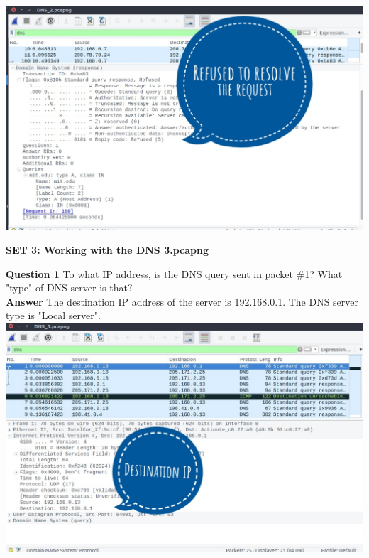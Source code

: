 \documentclass[14pt]{extarticle}
\begin{document}
    \includegraphics[scale=0.45]{2_4_2}\\[10pt] 
    \vspace{1cm}

    \begin{center}
        {\Large \textbf{SET 3: Working with the DNS 3.pcapng}}
    \end{center}

    \noindent
    \textbf{\large Question 1}
    To what IP address, is the DNS query sent in packet \#1? What "type" of DNS server is that?\\[10pt]
    \textbf{\large Answer}
    The destination IP address of the server is 192.168.0.1. The DNS server type is "Local server".\\[10pt]
    \includegraphics[scale=0.45]{3_1}\\[10pt]
    \vspace{1cm}
\end{document}
